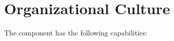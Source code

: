 \chapter{Organizational Culture}\label{ch:ekg-mm-d-4}

The  component has the following capabilities:

\begin{itemize}[leftmargin=.5in]
\end{itemize}





